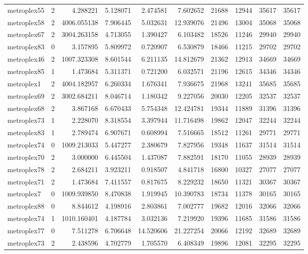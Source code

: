 \begin{longtable}{|l|r|r|r|r|r|r|r|r|r|}
metroplex55 & 2 & 4.288221 & 5.128071 & 2.474581 & 7.602652 & 21688 & 12944 & 35617 & 35617 \\
metroplex58 & 2 & 4006.055138 & 7.906445 & 5.032631 & 12.939076 & 21496 & 13004 & 35068 & 35068 \\
metroplex67 & 2 & 3004.263158 & 4.713055 & 1.390427 & 6.103482 & 18526 & 11246 & 29940 & 29940 \\
metroplex83 & 0 & 3.157895 & 5.809972 & 0.720907 & 6.530879 & 18466 & 11215 & 29702 & 29702 \\
metroplex46 & 2 & 1007.323308 & 8.601544 & 6.211135 & 14.812679 & 21362 & 12913 & 34669 & 34669 \\
metroplex85 & 1 & 1.473684 & 5.311371 & 0.721200 & 6.032571 & 21196 & 12615 & 34346 & 34346 \\
metroplex1 & 2 & 4004.182957 & 6.260334 & 1.676341 & 7.936675 & 21968 & 13241 & 35685 & 35685 \\
metroplex69 & 2 & 3002.684211 & 8.046714 & 1.180342 & 9.227056 & 20030 & 12205 & 32537 & 32537 \\
metroplex68 & 2 & 3.867168 & 6.670433 & 5.754348 & 12.424781 & 19344 & 11889 & 31396 & 31396 \\
metroplex73 & 1 & 2.228070 & 8.318554 & 3.397944 & 11.716498 & 19862 & 12047 & 32244 & 32244 \\
metroplex83 & 1 & 2.789474 & 6.907671 & 0.608994 & 7.516665 & 18512 & 11261 & 29771 & 29771 \\
metroplex74 & 0 & 1009.213033 & 5.447277 & 2.380679 & 7.827956 & 19348 & 11637 & 31514 & 31514 \\
metroplex70 & 2 & 3.000000 & 6.445504 & 1.437087 & 7.882591 & 18170 & 11055 & 28939 & 28939 \\
metroplex78 & 2 & 2.684211 & 3.923211 & 0.918507 & 4.841718 & 16800 & 10327 & 27077 & 27077 \\
metroplex71 & 2 & 1.473684 & 7.411557 & 0.817675 & 8.229232 & 18650 & 11321 & 30367 & 30367 \\
metroplex7 & 0 & 1009.939850 & 8.470838 & 1.919945 & 10.390783 & 18734 & 11378 & 30165 & 30165 \\
metroplex88 & 0 & 8.844612 & 4.198916 & 2.803861 & 7.002777 & 19682 & 12016 & 32066 & 32066 \\
metroplex74 & 1 & 1010.160401 & 4.187784 & 3.032136 & 7.219920 & 19396 & 11685 & 31586 & 31586 \\
metroplex77 & 0 & 7.511278 & 6.706648 & 14.520606 & 21.227254 & 20066 & 12192 & 32689 & 32689 \\
metroplex73 & 2 & 2.438596 & 4.702779 & 1.705570 & 6.408349 & 19896 & 12081 & 32295 & 32295 \\

\end{longtable}
